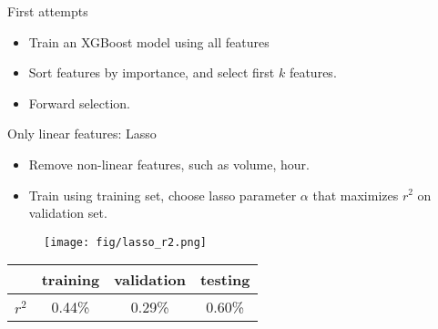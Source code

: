 \documentclass[9pt]{beamer}
\begin{document}
\begin{frame}{First attempts}

\begin{itemize}
    \item Train an XGBoost model using all features
    \item Sort features by importance, and select first $k$ features.
    \item Forward selection.
\end{itemize}


\end{frame}


\begin{frame}{Only linear features: Lasso}


\begin{itemize}
    \item Remove non-linear features, such as volume, hour.
    \item Train using training set, choose lasso parameter $\alpha$ that maximizes $r^2$ on validation set.
\end{itemize}

\begin{figure}
    \centering
    \texttt{[image: fig/lasso\_r2.png]}
\end{figure}


\begin{table}[h!]
\centering
\begin{tabular}{c|c|c|c}
\hline
 & \textbf{training} & \textbf{validation} & \textbf{testing} \\ \hline
$r^2$      & 0.44\%      & 0.29\%      & 0.60\%    \\ \hline
\end{tabular}
\end{table}


\end{frame}
\end{document}
